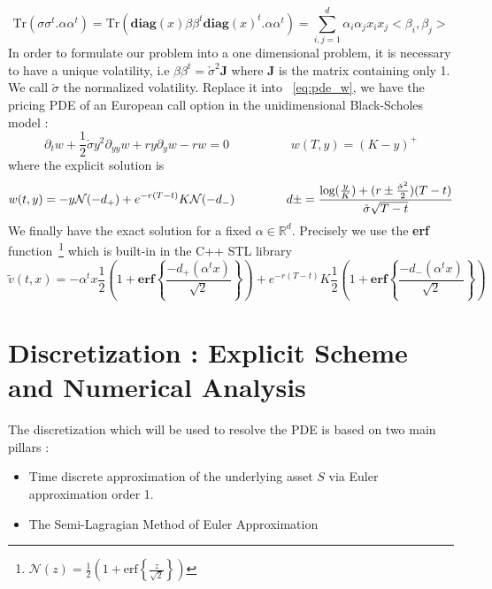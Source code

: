 \documentclass[a4paper,10pt]{article}
\begin{document}
\[
\text{Tr}(\sigma \sigma^{t}.\alpha\alpha^{t}) 
= \text{Tr}( \textbf{diag}(x) \beta\beta^{t} \textbf{diag}(x)^t.\alpha\alpha^{t})
= \sum_{i,j=1}^d \alpha_i\alpha_j x_i x_j <\beta_i , \beta_j>
\]
In order to formulate our problem into a one dimensional problem, it is necessary to have a unique volatility, i.e $\beta\beta^{t} = \check{\sigma}^2 \textbf{J}$ where \textbf{J} is the matrix containing only 1. We call $\check{\sigma}$ the normalized volatility. Replace it into ~\eqref{eq:pde_w}, we have the pricing PDE of an European call option in the unidimensional Black-Scholes model :
\begin{equation}\label{eq:bs_1}
\partial_t w +\frac{1}{2} \check{\sigma} y^2 \partial_{yy} w  +  r y \partial_{y} w - r w =0 \
\hspace{2cm}
w(T,y) = (K-y)^+
\end{equation}
where the explicit solution is 
\begin{equation}
w(t,y) =- y \mathcal{N}(-d_+) + e^{-r(T-t)} K \mathcal{N}(-d_-)
\hspace{1.5cm}
d\pm = \frac{ \text{log}(\frac{y}{K}) + (r \pm \frac{\check{\sigma}^2}{2} )(T-t) } {   \check{\sigma}  \sqrt{T-t} }   
\end{equation}
We finally have the exact solution for a fixed $\alpha \in \mathbb{R}^d$. Precisely we use the \textbf{erf} function~\footnote{$ \mathcal{N}(z)=\frac{1}{2}(1+\text{erf}\left\{\frac{z}{\sqrt{2}}\right\})$} which is built-in in the C++ STL library 
\begin{equation}\label{eq:closed_sol}
\tilde{v}(t,x) =- \alpha^{t}x  \frac{1}{2}(1+\textbf{erf}\left\{\frac{-d_+(\alpha^{t}x)}{\sqrt{2}}\right\} )   + e^{-r(T-t)} K \frac{1}{2}(1+\textbf{erf}\left\{\frac{-d_-(\alpha^{t}x)}{\sqrt{2}}\right\} ) 
\end{equation}


\section{Discretization : Explicit Scheme and Numerical Analysis}
The discretization which will be used to resolve the PDE is based on two main pillars :
\begin{itemize}
\item Time discrete approximation of the underlying asset $S$ via Euler approximation order 1. 
\item The Semi-Lagragian Method of Euler Approximation
\end{itemize} 
\end{document}
